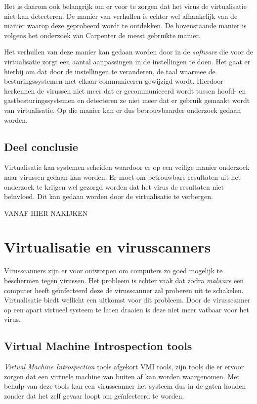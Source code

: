 \documentclass[12pt]{uva-inf-article}
\begin{document}
Het is daarom ook belangrijk om er voor te zorgen dat het virus de virtualisatie niet
kan detecteren. De manier van verhullen is echter wel afhankelijk van de manier
waarop deze geprobeerd wordt te ontdekken. De bovenstaande manier is volgens
het onderzoek van Carpenter de meest gebruikte manier. \cite{carpenter2007hiding}

Het verhullen van deze manier kan gedaan worden door in de \textit{software} die
voor de virtualisatie zorgt een aantal aanpassingen in de instellingen te doen.
Het gaat er hierbij om dat door de instellingen te veranderen, de taal waarmee
de besturingssystemen met elkaar communiceren gewijzigd wordt. Hierdoor herkennen
de virussen niet meer dat er gecommuniceerd wordt tussen hoofd- en gastbesturingssystemen
en detecteren ze niet meer dat er gebruik gemaakt wordt van virtualisatie. Op die manier kan er
dus betrouwbaarder onderzoek gedaan worden.

\subsection{Deel conclusie}
Virtualisatie kan systemen scheiden waardoor er op een veilige manier onderzoek
naar virussen gedaan kan worden. Er moet om betrouwbare resultaten uit het onderzoek te krijgen wel gezorgd worden
dat het virus de resultaten niet be\"{i}nvloed. Dit kan gedaan worden door de
virtualisatie te verbergen.


VANAF HIER NAKIJKEN

\section{Virtualisatie en virusscanners}
Virusscanners zijn er voor ontworpen om computers zo goed mogelijk te beschermen
tegen virussen. Het probleem is echter vaak dat zodra \textit{malware} een computer heeft
ge\"{i}nfecteerd deze de virusscanner zal proberen uit te schakelen. Virtualisatie
biedt wellicht een uitkomst voor dit probleem. Door de virusscanner op een apart
virtueel systeem te laten draaien is deze niet meer vatbaar voor het virus.

\subsection{Virtual Machine Introspection tools}
\textit{Virtual Machine Introspection} tools afgekort VMI tools, zijn tools die
er ervoor zorgen dat een virtuele machine van buiten af kan worden waargenomen.
Met behulp van deze tools kan een virusscanner het systeem dus in de gaten houden
zonder dat het zelf gevaar loopt om ge\"{i}nfecteerd te worden.
\cite{garfinkel2003virtual}
\end{document}
